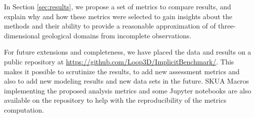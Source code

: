 \documentclass[preprint]{ring20}
\begin{document}
In Section \ref{sec:results}, we propose a set of metrics to compare results, and explain why and how these metrics were selected to gain insights about the methods and their ability to provide a reasonable approximation of of three-dimensional geological domains from incomplete observations. 

For future extensions and completeness, we have placed the data and results on a public repository at \url{https://github.com/Loop3D/ImplicitBenchmark/}. This makes it possible to scrutinize the results, to add new assessment metrics and also to add new modeling results and new data sets in the future. SKUA Macros implementing the proposed analysis metrics and some Jupyter notebooks are also available on the repository to help with the reproducibility of the metrics computation. 

\end{document}
